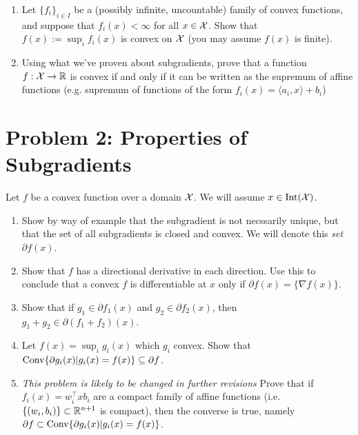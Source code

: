 \documentclass[12pt]{article}
\begin{document}
\begin{enumerate}
\item
Let $\{f_{i}\}_{i \in I}$ be a (possibly infinite, uncountable) family of convex functions, and suppose that $f_{i}(x) < \infty$ for all $x \in {\cal X}$. Show that $f(x) := \sup_{i} f_{i}(x)$ is convex on ${\cal X}$ (you may assume $f(x)$ is finite).

\item
Using what we've proven about subgradients, prove that a function $f: {\cal X} \to \mathbb{R}$ is convex if and only if it can be written as the supremum of affine functions (e.g. supremum of functions of the form $f_i(x) = \langle a_{i}, x \rangle + b_{i}$)
\end{enumerate}

\section*{Problem 2: Properties of Subgradients}
Let $f$ be a convex function over a domain ${\cal X}$. We will assume $x \in \mathrm{Int}({\cal X})$. 
\begin{enumerate}
\item
Show by way of example that the subgradient is not necssarily unique, but that the set of all subgradients is closed and convex. We will denote this \emph{set} $\partial f(x)$.
\item Show that $f$ has a directional derivative in each direction. Use this to conclude that a convex $f$ is differentiable at $x$ only if $\partial f(x) = \{\nabla f(x)\}$.
\item
Show that if $g_1 \in \partial f_1(x)$ and $g_2 \in \partial f_2(x)$, then $g_1 + g_2 \in \partial(f_1 + f_2)(x)$. 
\item
Let $f(x) = \sup_{i} g_{i}(x)$ which $g_{i}$ convex. Show that $\mathrm{Conv} \{\partial g_{i}(x) |  g_{i}(x) =f(x) \} \subseteq \partial f$. 
\item \emph{This problem is likely to be changed in further revisions} Prove that if $f_{i}(x) = w_{i}^\top x
b_{i}$ are a compact family of affine functions (i.e.
$\{(w_{i},b_{i})\} \subset \mathbb{R}^{n+1}$ is compact), then the converse is true, namely $\partial f \subset \mathrm{Conv} \{\partial g_{i}(x) |  g_{i}(x) =f(x) \} $. 
\end{enumerate}
\end{document}
